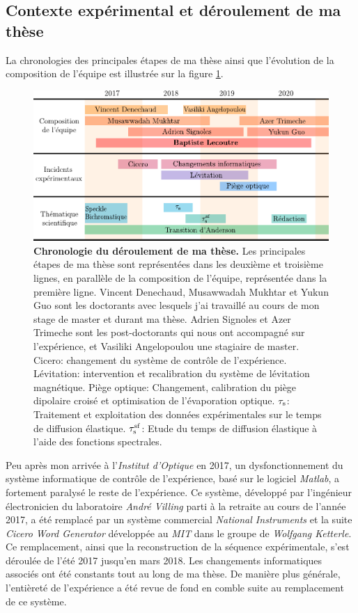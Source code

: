 \subsection{Contexte expérimental et déroulement de ma thèse}
La chronologies des principales étapes de ma thèse ainsi que l'évolution de la composition de l'équipe est illustrée sur la figure \ref{fig:chronologie}.

\begin{figure}
\centering
\includegraphics[width=\textwidth]{Fig/Introduction/chronologie.pdf}
\caption{\textbf{Chronologie du déroulement de ma thèse.} Les principales étapes de ma thèse sont représentées dans les deuxième et troisième lignes, en parallèle de la composition de l'équipe, représentée dans la première ligne. Vincent Denechaud, Musawwadah Mukhtar et Yukun Guo sont les doctorants avec lesquels j'ai travaillé au cours de mon stage de master et durant ma thèse. Adrien Signoles et Azer Trimeche sont les post-doctorants qui nous ont accompagné sur l'expérience, et Vasiliki Angelopoulou une stagiaire de master. Cicero: changement du système de contrôle de l'expérience. Lévitation: intervention et recalibration du système de lévitation magnétique. Piège optique: Changement, calibration du piège dipolaire croisé et optimisation de l'évaporation optique. $\tau_{\mathrm{s}}$: Traitement et exploitation des données expérimentales sur le temps de diffusion élastique. $\tau_{\mathrm{s}}^{\mathrm{sf}}$: Etude du temps de diffusion élastique à l'aide des fonctions spectrales. }
\label{fig:chronologie}
\end{figure}


Peu après mon arrivée à l'\emph{Institut d'Optique} en 2017, un dysfonctionnement du système informatique de contrôle de l'expérience, basé sur le logiciel \emph{Matlab}, a fortement paralysé le reste de l'expérience. Ce système, développé par l'ingénieur électronicien du laboratoire \emph{André Villing} parti à la retraite au cours de l'année 2017, a été remplacé par un système commercial \emph{National Instruments} et la suite \emph{Cicero Word Generator} développée au \emph{MIT} dans le groupe de \emph{Wolfgang Ketterle}. Ce remplacement, ainsi que la reconstruction de la séquence expérimentale, s'est déroulée de l'été 2017 jusqu'en mars 2018. Les changements informatiques associés ont été constants tout au long de ma thèse. De manière plus générale, l'entièreté de l'expérience a été revue de fond en comble suite au remplacement de ce système.



